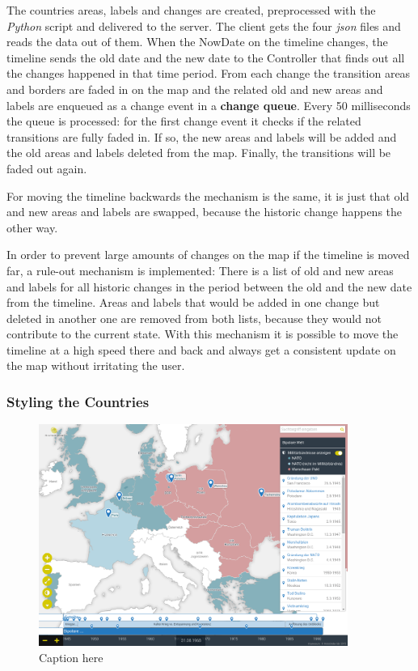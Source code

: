 The countries areas, labels and changes are created, preprocessed with the \textit{Python} script and delivered to the server. The client gets the four \textit{json} files and reads the data out of them. When the NowDate on the timeline changes, the timeline sends the old date and the new date to the Controller that finds out all the changes happened in that time period. From each change the transition areas and borders are faded in on the map and the related old and new areas and labels are enqueued as a change event in a \textbf{change queue}. Every 50 milliseconds the queue is processed: for the first change event it checks if the related transitions are fully faded in. If so, the new areas and labels will be added and the old areas and labels deleted from the map. Finally, the transitions will be faded out again.

For moving the timeline backwards the mechanism is the same, it is just that old and new areas and labels are swapped, because the historic change happens the other way.

In order to prevent large amounts of changes on the map if the timeline is moved far, a rule-out mechanism is implemented: There is a list of old and new areas and labels for all historic changes in the period between the old and the new date from the timeline. Areas and labels that would be added in one change but deleted in another one are removed from both lists, because they would not contribute to the current state. With this mechanism it is possible to move the timeline at a high speed there and back and always get a consistent update on the map without irritating the user.


\subsubsection{Styling the Countries} %
\label{ssub:styling_the_countries}

\begin{figure}[H]
  \begin{center}
    \includegraphics[width=0.9\textwidth]{graphics/bipolare_welt}
  \end{center}
  \caption{Caption here}
  \label{fig:figure1}
\end{figure}


